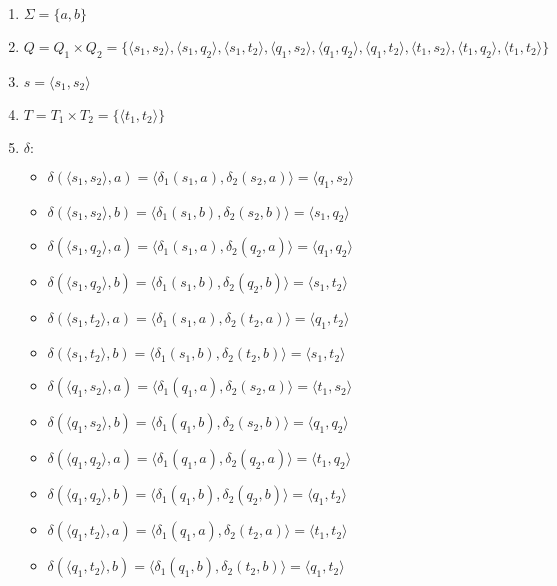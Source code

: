 \documentclass[a4paper, 12pt]{article}
\begin{document}
\begin{enumerate}
    \item $ \Sigma = \{ a, b \} $
    \item $ Q = Q_1 \times Q_2 = \{ \langle s_1, s_2 \rangle, \langle s_1, q_2 \rangle, \langle s_1, t_2 \rangle, \langle q_1, s_2 \rangle, \langle q_1, q_2 \rangle, \langle q_1, t_2 \rangle, \langle t_1, s_2 \rangle, \langle t_1, q_2 \rangle, \langle t_1, t_2 \rangle \} $
    \item $ s = \langle s_1, s_2 \rangle $
    \item $ T = T_1 \times T_2 = \{ \langle t_1, t_2 \rangle \}$
    \item $ \delta : $
    \begin{itemize}
        \item $ \delta (\langle s_1, s_2 \rangle, a) = \langle \delta_1 (s_1, a), \delta_2 (s_2, a) \rangle = \langle q_1, s_2 \rangle $
        \item $ \delta (\langle s_1, s_2 \rangle, b) = \langle \delta_1 (s_1, b), \delta_2 (s_2, b) \rangle = \langle s_1, q_2 \rangle $
        \item $ \delta (\langle s_1, q_2 \rangle, a) = \langle \delta_1 (s_1, a), \delta_2 (q_2, a) \rangle = \langle q_1, q_2 \rangle $
        \item $ \delta (\langle s_1, q_2 \rangle, b) = \langle \delta_1 (s_1, b), \delta_2 (q_2, b) \rangle = \langle s_1, t_2 \rangle $
        \item $ \delta (\langle s_1, t_2 \rangle, a) = \langle \delta_1 (s_1, a), \delta_2 (t_2, a) \rangle = \langle q_1, t_2 \rangle $
        \item $ \delta (\langle s_1, t_2 \rangle, b) = \langle \delta_1 (s_1, b), \delta_2 (t_2, b) \rangle = \langle s_1, t_2 \rangle $
        
        \item $ \delta (\langle q_1, s_2 \rangle, a) = \langle \delta_1 (q_1, a), \delta_2 (s_2, a) \rangle = \langle t_1, s_2 \rangle $
        \item $ \delta (\langle q_1, s_2 \rangle, b) = \langle \delta_1 (q_1, b), \delta_2 (s_2, b) \rangle = \langle q_1, q_2 \rangle $
        \item $ \delta (\langle q_1, q_2 \rangle, a) = \langle \delta_1 (q_1, a), \delta_2 (q_2, a) \rangle = \langle t_1, q_2 \rangle $
        \item $ \delta (\langle q_1, q_2 \rangle, b) = \langle \delta_1 (q_1, b), \delta_2 (q_2, b) \rangle = \langle q_1, t_2 \rangle $
        \item $ \delta (\langle q_1, t_2 \rangle, a) = \langle \delta_1 (q_1, a), \delta_2 (t_2, a) \rangle = \langle t_1, t_2 \rangle $
        \item $ \delta (\langle q_1, t_2 \rangle, b) = \langle \delta_1 (q_1, b), \delta_2 (t_2, b) \rangle = \langle q_1, t_2 \rangle $
        

\end{itemize}
\end{enumerate}
\end{document}

